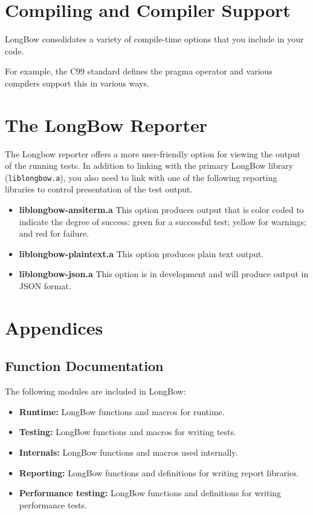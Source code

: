 \section {Compiling and Compiler Support}
LongBow consolidates a variety of compile-time options that you include in your code.

For example, the C99 standard defines the pragma operator and various compilers support this in various ways.

\section{The LongBow Reporter}  
The Longbow reporter offers a more user-friendly option for viewing the output of the running tests. In addition to linking with the primary LongBow library ({\tt liblongbow.a}), you also need to link with one of the following reporting libraries to control presentation of the test output.
\begin{itemize}
\item {\bf liblongbow-ansiterm.a} This option produces output that is color coded to indicate the degree of success: green for a successful test; yellow for warnings; and red for failure.
\item {\bf liblongbow-plaintext.a} This option produces plain text output.
\item {\bf liblongbow-json.a} This option is in development and will produce output in JSON format.
\end{itemize}



\section {Appendices}
\subsection {Function Documentation}
The following modules are included in LongBow:
\begin {itemize}
\item \textbf{Runtime:}	LongBow functions and macros for runtime.
\item \textbf{Testing:}	 LongBow functions and macros for writing tests.
\item \textbf{Internals:} LongBow functions and macros used internally.
\item \textbf{Reporting:}	LongBow functions and definitions for writing report libraries.
\item \textbf{Performance testing:} LongBow functions and definitions for writing performance tests.
\end{itemize}

